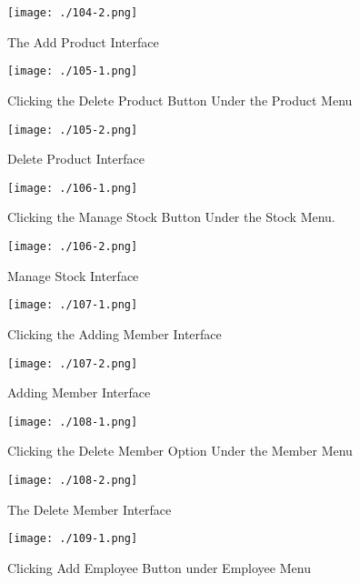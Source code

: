 \begin{figure}[H]
    \texttt{[image: ./104-2.png]}
    \caption{The Add Product Interface} \label{fig:add_product_interface}
\end{figure}

\begin{figure}[H]
    \texttt{[image: ./105-1.png]}
    \caption{Clicking the Delete Product Button Under the Product Menu} \label{fig:click_delete_product}
\end{figure}

\begin{figure}[H]
    \texttt{[image: ./105-2.png]}
    \caption{Delete Product Interface} \label{fig:delete_product_interface}
\end{figure}

\begin{figure}[H]
    \texttt{[image: ./106-1.png]}
    \caption{Clicking the Manage Stock Button Under the Stock Menu.} \label{fig:click_stock}
\end{figure}

\begin{figure}[H]
    \texttt{[image: ./106-2.png]}
    \caption{Manage Stock Interface} \label{fig:manage_stock}
\end{figure}

\begin{figure}[H]
    \texttt{[image: ./107-1.png]}
    \caption{Clicking the Adding Member Interface} \label{fig:click_add_member}
\end{figure}

\begin{figure}[H]
    \texttt{[image: ./107-2.png]}
    \caption{Adding Member Interface} \label{fig:add_member_interface}
\end{figure}

\begin{figure}[H]
    \texttt{[image: ./108-1.png]}
    \caption{Clicking the Delete Member Option Under the Member Menu} \label{fig:click_delete_member}
\end{figure}

\begin{figure}[H]
    \texttt{[image: ./108-2.png]}
    \caption{The Delete Member Interface} \label{fig:delete_member_interface}
\end{figure}

\begin{figure}[H]
    \texttt{[image: ./109-1.png]}
    \caption{Clicking Add Employee Button under Employee Menu} \label{fig:click_employee}
\end{figure}

